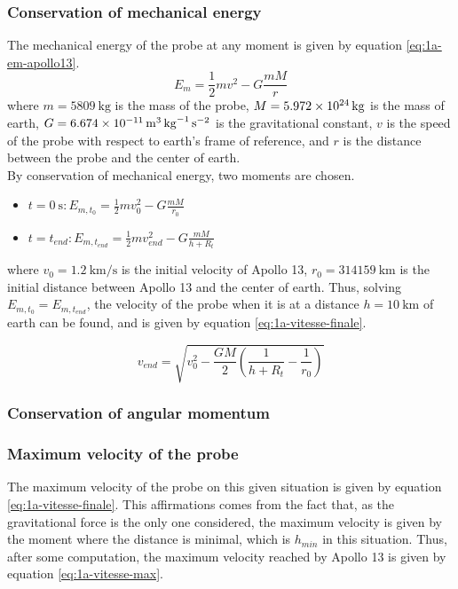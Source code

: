 \documentclass[a4paper,12pt,twoside]{article}
\begin{document}
\subsubsection{Conservation of mechanical energy}
The mechanical energy of the probe at any moment is given by equation \eqref{eq:1a-em-apollo13}.
\begin{equation}
  E_m = \frac{1}{2}mv^2 - G\frac{mM}{r}
  \label{eq:1a-em-apollo13}
\end{equation}
where $m=\SI{5809}{\kilo\gram}$ is the mass of the probe, $M=\SI{5.972d24}{\kilo\gram}$ is the mass of earth, $G=\SI{6.674d-11}{\cubic\meter\per\kilo\gram\per\square\second}$ is the gravitational constant, $v$ is the speed of the probe with respect to earth's frame of reference, and $r$ is the distance between the probe and the center of earth.\\

By conservation of mechanical energy, two moments are chosen.
\begin{itemize}
  \item $t=\SI{0}{\s}: E_{m,t_0} = \frac{1}{2}mv_0^2 - G\frac{mM}{r_0}$
  \item $t=t_{end}: E_{m,t_{end}} = \frac{1}{2}mv_{end}^2 - G\frac{mM}{h + R_t}$
\end{itemize}
where $v_0 = \SI{1.2}{\kilo\meter\per\second}$ is the initial velocity of Apollo 13, $r_0 = \SI{314159}{\kilo\meter}$ is the initial distance between Apollo 13 and the center of earth.
Thus, solving $E_{m,t_0} = E_{m,t_{end}}$, the velocity of the probe when it is at a distance $h=\SI{10}{\kilo\meter}$ of earth can be found, and is given by equation \eqref{eq:1a-vitesse-finale}.

\begin{equation}
  v_{end} = \sqrt{v_0^2 - \frac{GM}{2}\left(\frac{1}{h + R_t} - \frac{1}{r_0}\right)}
  \label{eq:1a-vitesse-finale}
\end{equation}

\subsubsection{Conservation of angular momentum}

\subsubsection{Maximum velocity of the probe}
The maximum velocity of the probe on this given situation is given by equation \eqref{eq:1a-vitesse-finale}.
This affirmations comes from the fact that, as the gravitational force is the only one considered, the maximum velocity is given by the moment where the distance is minimal, which is $h_{min}$ in this situation.
Thus, after some computation, the maximum velocity reached by Apollo 13 is given by equation \eqref{eq:1a-vitesse-max}.
\end{document}
